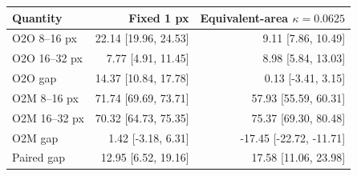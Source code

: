 \begin{tabular}{lrr}
\toprule
Quantity & Fixed 1 px & Equivalent-area $\kappa=0.0625$ \\
\midrule
O2O 8--16 px & 22.14 [19.96, 24.53] & 9.11 [7.86, 10.49] \\
O2O 16--32 px & 7.77 [4.91, 11.45] & 8.98 [5.84, 13.03] \\
O2O gap & 14.37 [10.84, 17.78] & 0.13 [-3.41, 3.15] \\
O2M 8--16 px & 71.74 [69.69, 73.71] & 57.93 [55.59, 60.31] \\
O2M 16--32 px & 70.32 [64.73, 75.35] & 75.37 [69.30, 80.48] \\
O2M gap & 1.42 [-3.18, 6.31] & -17.45 [-22.72, -11.71] \\
Paired gap & 12.95 [6.52, 19.16] & 17.58 [11.06, 23.98] \\
\bottomrule
\end{tabular}
